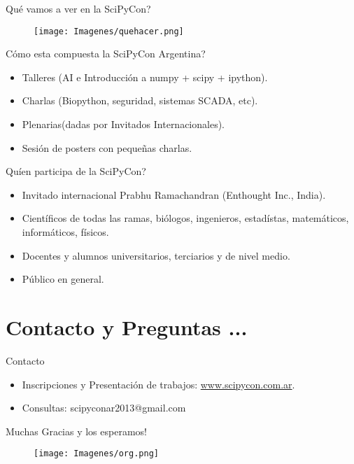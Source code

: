 \documentclass[xcolor=dvipsnames]{beamer}
\begin{document}
\begin{frame}{Qu\'e vamos a ver en la SciPyCon?}
 \begin{figure}[h]
		\texttt{[image: Imagenes/quehacer.png]}
\end{figure}
%
\end{frame}

\begin{frame}{Cómo esta compuesta la SciPyCon Argentina?}
	\begin{itemize}
		\item Talleres (AI e Introducción a numpy + scipy + ipython).
		\item Charlas (Biopython, seguridad, sistemas SCADA, etc).
		\item Plenarias(dadas por Invitados Internacionales).
		\item Sesión de posters con pequeñas charlas.
	\end{itemize}
\end{frame}
\begin{frame}{Quíen participa de la SciPyCon?}
	\begin{itemize}
		\item Invitado internacional Prabhu Ramachandran (Enthought Inc., India).
		\item Científicos de todas las ramas, biólogos, ingenieros, estadístas, matemáticos, informáticos, físicos.
		\item Docentes y alumnos universitarios, terciarios y de nivel medio.
		\item Público en general. 
	\end{itemize}
\end{frame}

\section{Contacto y Preguntas ...}
\begin{frame}{Contacto}
	\begin{itemize}
		\item Inscripciones y Presentación de trabajos: \url{www.scipycon.com.ar}.
		\item Consultas: scipyconar2013@gmail.com
	\end{itemize}
	\begin{center}
	      \huge{Muchas Gracias y los esperamos!}
        \end{center}
 \begin{figure}[h]
		\texttt{[image: Imagenes/org.png]}
\end{figure}
\end{frame}
\end{document}
